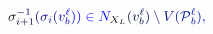 \documentclass[12pt]{article}
\begin{document}
\makeatletter
\renewcommand*{\@textcolor}[3]{%
  \protect\leavevmode
  \begingroup
    \color#1{#2}#3%
  \endgroup
}
\makeatother
\begin{displaymath}
\mathcolor[RGB]{0,0,15}{\sigma} _ { \mathcolor[RGB]{0,0,30}{i} \mathcolor[RGB]{0,0,45}{+} \mathcolor[RGB]{0,0,60}{1} } ^ { \mathcolor[RGB]{0,0,75}{-} \mathcolor[RGB]{0,0,90}{1} } \mathcolor[RGB]{0,0,105}{(} \mathcolor[RGB]{0,0,120}{\sigma} _ { \mathcolor[RGB]{0,0,135}{i} } \mathcolor[RGB]{0,0,150}{(} \mathcolor[RGB]{0,0,165}{v} _ { \mathcolor[RGB]{0,0,180}{b} } ^ { \mathcolor[RGB]{0,0,195}{\ell} } \mathcolor[RGB]{0,0,210}{)} \mathcolor[RGB]{0,0,225}{)} \mathcolor[RGB]{0,0,240}{\in} \mathcolor[RGB]{0,0,255}{N} _ { \mathcolor[RGB]{0,15,0}{X} _ { \mathcolor[RGB]{0,15,15}{L} } } \mathcolor[RGB]{0,15,30}{(} \mathcolor[RGB]{0,15,45}{v} _ { \mathcolor[RGB]{0,15,60}{b} } ^ { \mathcolor[RGB]{0,15,75}{\ell} } \mathcolor[RGB]{0,15,90}{)} \mathcolor[RGB]{0,15,105}{\setminus} \mathcolor[RGB]{0,15,120}{V} \mathcolor[RGB]{0,15,135}{(} \mathcal { \mathcolor[RGB]{0,15,150}{P} } _ { \mathcolor[RGB]{0,15,165}{b} } ^ { \mathcolor[RGB]{0,15,180}{\ell} } \mathcolor[RGB]{0,15,195}{)} \mathcolor[RGB]{0,15,210}{,}
\end{displaymath}
\end{document}

